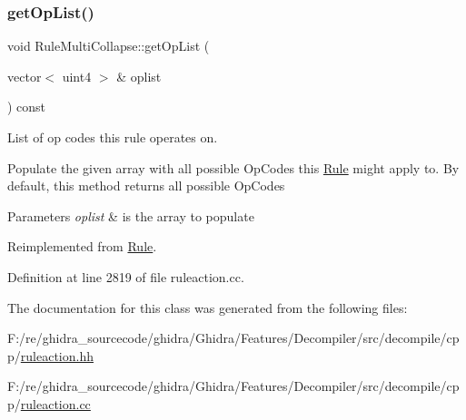 \subsubsection{\texorpdfstring{getOpList()}{getOpList()}}
{\footnotesize\ttfamily void Rule\+Multi\+Collapse\+::get\+Op\+List (\begin{DoxyParamCaption}\item[{vector$<$ uint4 $>$ \&}]{oplist }\end{DoxyParamCaption}) const\hspace{0.3cm}{\ttfamily [virtual]}}



List of op codes this rule operates on. 

Populate the given array with all possible Op\+Codes this \mbox{\hyperlink{class_rule}{Rule}} might apply to. By default, this method returns all possible Op\+Codes 
\begin{DoxyParams}{Parameters}
{\em oplist} & is the array to populate \\
\hline
\end{DoxyParams}


Reimplemented from \mbox{\hyperlink{class_rule_a4023bfc7825de0ab866790551856d10e}{Rule}}.



Definition at line 2819 of file ruleaction.\+cc.



The documentation for this class was generated from the following files\+:\begin{DoxyCompactItemize}
\item 
F\+:/re/ghidra\+\_\+sourcecode/ghidra/\+Ghidra/\+Features/\+Decompiler/src/decompile/cpp/\mbox{\hyperlink{ruleaction_8hh}{ruleaction.\+hh}}\item 
F\+:/re/ghidra\+\_\+sourcecode/ghidra/\+Ghidra/\+Features/\+Decompiler/src/decompile/cpp/\mbox{\hyperlink{ruleaction_8cc}{ruleaction.\+cc}}\end{DoxyCompactItemize}

